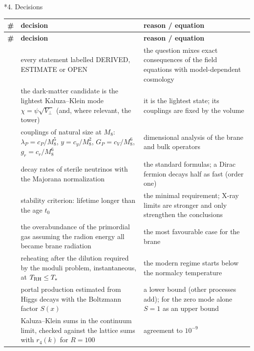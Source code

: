 \documentclass[10pt,a4paper]{article}
\makeatletter
\renewcommand\section{\@startsection{section}{1}{\z@}{-3.5ex \@plus -1ex \@minus -.2ex}{2.3ex \@plus.2ex}{\normalfont\Large\bfseries\raggedright}}
\makeatother
\begin{document}
\section*{4. Decisions}
{\footnotesize
\begin{longtable}{>{\raggedright\arraybackslash}p{}>{\raggedright\arraybackslash}p{}>{\raggedright\arraybackslash}p{}}
\toprule
\textbf{\#} & \textbf{decision} & \textbf{reason / equation} \\
\midrule\endfirsthead
\toprule
\textbf{\#} & \textbf{decision} & \textbf{reason / equation} \\
\midrule\endhead
\endfoot
\bottomrule\endlastfoot
1 & every statement labelled DERIVED, ESTIMATE or OPEN & the question mixes exact consequences of the field equations with model-dependent cosmology \\
2 & the dark-matter candidate is the lightest Kaluza–Klein mode $\chi=\psi\sqrt{V_\perp}$ (and, where relevant, the tower) & it is the lightest state; its couplings are fixed by the volume \\
3 & couplings of natural size at $M_8$: $\lambda_P=c_P/M_8^5$, $y=c_y/M_8^2$, $G_P=c_V/M_8^6$, $g_r=c_r/M_8^6$ & dimensional analysis of the brane and bulk operators \\
4 & decay rates of sterile neutrinos with the Majorana normalization & the standard formulas; a Dirac fermion decays half as fast (order one) \\
5 & stability criterion: lifetime longer than the age $t_0$ & the minimal requirement; X-ray limits are stronger and only strengthen the conclusions \\
6 & the overabundance of the primordial gas assuming the radion energy all became brane radiation & the most favourable case for the brane \\
7 & reheating after the dilution required by the moduli problem, instantaneous, at $T_{\rm RH}\le T_*$ & the modern regime starts below the normalcy temperature \\
8 & portal production estimated from Higgs decays with the Boltzmann factor $S(x)$ & a lower bound (other processes add); for the zero mode alone $S=1$ as an upper bound \\
9 & Kaluza–Klein sums in the continuum limit, checked against the lattice sums with $r_4(k)$ for $R=100$ & agreement to $10^{-9}$ \\

\end{longtable}}
\end{document}
